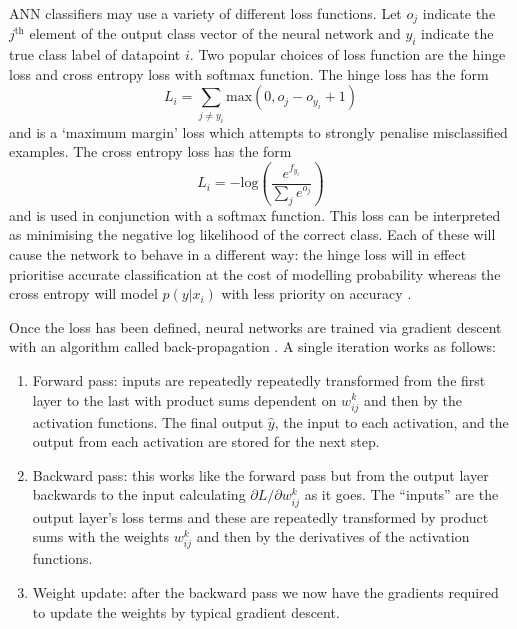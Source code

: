 ANN classifiers may use a variety of different loss functions. 
Let $o_{j}$ indicate the $j^{\mathrm{th}}$ element of the output class vector of the neural network and $y_{i}$ indicate the true class label of datapoint $i$. 
Two popular choices of loss function \cite{CS231n} are the hinge loss and cross entropy loss with softmax function.
The hinge loss has the form
\begin{equation}
    L_{i} = \sum_{j\neq{}y_{i}}\mathrm{max}(0,o_{j}-o_{y_{i}} + 1)
\end{equation}
and is a `maximum margin' loss which attempts to strongly penalise misclassified examples. 
The cross entropy loss has the form
\begin{equation}
    L_{i} = -\mathrm{log}\left(
        \frac{e^{f_{y_{i}}}}
        {\sum_{j}e^{o_{j}}}\right)
\end{equation}
and is used in conjunction with a softmax function. This loss can be interpreted as minimising the negative log likelihood of the correct class.
Each of these will cause the network to behave in a different way: the hinge loss will in effect prioritise accurate classification at the cost of modelling probability whereas the cross entropy will model $p(y|x_{i})$ with less priority on accuracy \cite{CS231n}.

Once the loss has been defined, neural networks are trained via gradient descent with an algorithm called back-propagation \cite{Backprop}. A single iteration works as follows:
\begin{enumerate}[leftmargin=.5in,noitemsep]
    \item Forward pass: inputs are repeatedly repeatedly transformed from the first layer to the last with product sums dependent on $w_{ij}^{k}$ and then by the activation functions. The final output $\hat{y}$, the input to each activation, and the output from each activation are stored for the next step. 
    \item Backward pass: this works like the forward pass but from the output layer backwards to the input calculating $\partial{L}/\partial{w_{ij}^{k}}$ as it goes. The ``inputs'' are the output layer's loss terms and these are repeatedly transformed by product sums with the weights $w_{ij}^{k}$ and then by the derivatives of the activation functions.  
    \item Weight update: after the backward pass we now have the gradients required to update the weights by typical gradient descent.
\end{enumerate}


